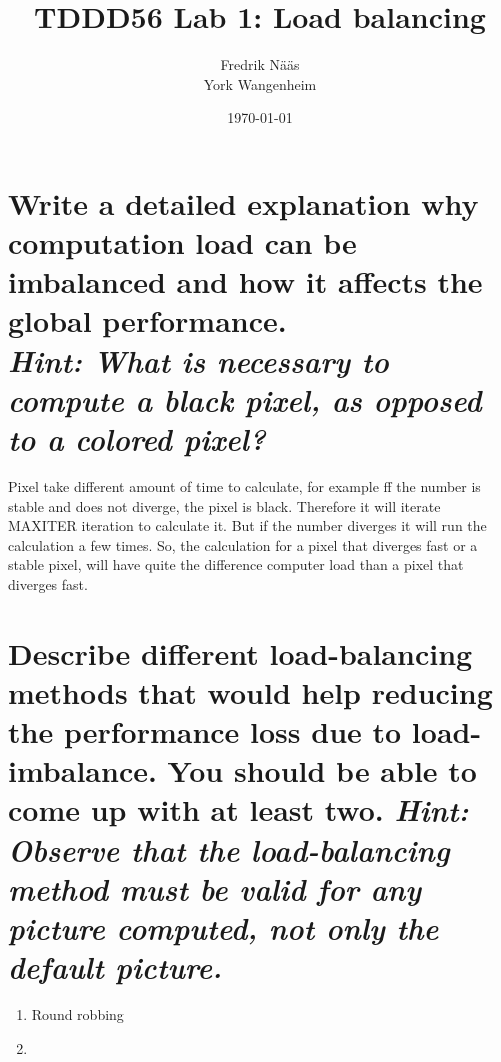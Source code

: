 \documentclass{article}
\title{TDDD56 Lab 1: Load balancing}
\author{Fredrik Nääs\\York Wangenheim}
\date{\today}
\begin{document}
\maketitle

\section{Write a detailed explanation why computation load can be imbalanced and how it affects the global performance. \\\textit{Hint: What is necessary to compute a black pixel, as opposed to a colored pixel?}}
Pixel take different amount of time to calculate, for example ff the number is stable and does not diverge,  the pixel is black. Therefore it will iterate MAXITER iteration to calculate it.  But if the number diverges it will  run the calculation a few times.
So, the calculation for a pixel that diverges fast or a stable pixel, will have quite the difference computer load than a pixel that diverges fast. 

\section{Describe different load-balancing methods that would help reducing the performance
loss due to load-imbalance. You should be able to come up with at least two.
\textit{Hint: Observe that the load-balancing method must be valid for any picture computed, not only the default picture.}}
\begin{enumerate}
    \item Round robbing
    \item 
\end{enumerate}
\end{document}
